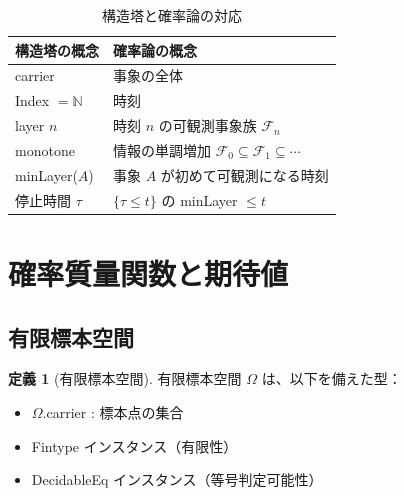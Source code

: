 \documentclass[a4paper,12pt]{ltjsarticle}
\theoremstyle{definition}
\newtheorem{definition}{定義}[section]
\begin{document}
\begin{center}
\end{center}

\begin{table}[h]
\centering
\caption{構造塔と確率論の対応}
\begin{tabular}{ll}
\hline
構造塔の概念 & 確率論の概念 \\
\hline
carrier & 事象の全体 \\
Index $= \mathbb{N}$ & 時刻 \\
layer $n$ & 時刻 $n$ の可観測事象族 $\mathcal{F}_n$ \\
monotone & 情報の単調増加 $\mathcal{F}_0 \subseteq \mathcal{F}_1 \subseteq \cdots$ \\
minLayer($A$) & 事象 $A$ が初めて可観測になる時刻 \\
停止時間 $\tau$ & $\{\tau \leq t\}$ の minLayer $\leq t$ \\
\hline
\end{tabular}
\end{table}

\section{確率質量関数と期待値}

\subsection{有限標本空間}

\begin{definition}[有限標本空間]
有限標本空間 $\Omega$ は、以下を備えた型：
\begin{itemize}
  \item $\Omega$.carrier : 標本点の集合
  \item Fintype インスタンス（有限性）
  \item DecidableEq インスタンス（等号判定可能性）
\end{itemize}
\end{definition}
\end{document}
